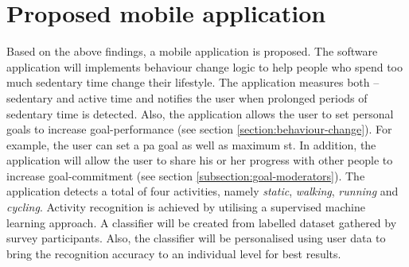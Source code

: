 \section{Proposed mobile application}
\label{section:proposed-application}
Based on the above findings, a mobile application is proposed. The software application will implements behaviour change logic to help people who spend too much sedentary time change their lifestyle. The application measures both – sedentary and active time and notifies the user when prolonged periods of sedentary time is detected. Also, the application allows the user to set personal goals to increase goal-performance (see section \ref{section:behaviour-change}). For example, the user can set a \gls{pa} goal as well as maximum \gls{st}. In addition, the application will allow the user to share his or her progress with other people to increase goal-commitment (see section \ref{subsection:goal-moderators}). The application detects a total of four activities, namely \textit{static}, \textit{walking}, \textit{running} and \textit{cycling}. Activity recognition is achieved by utilising a supervised machine learning approach. A classifier will be created from labelled dataset gathered by survey participants. Also, the classifier will be personalised using user data to bring the recognition accuracy to an individual level for best results. 
